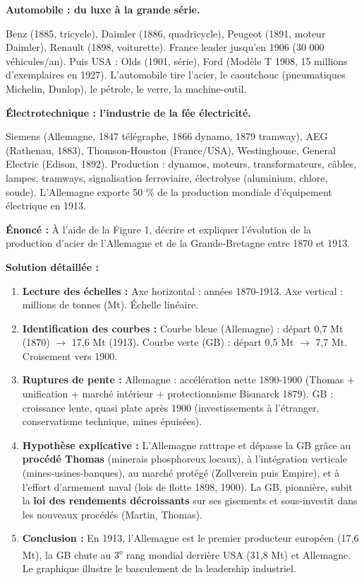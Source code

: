 \documentclass[11pt]{article}
\begin{document}
\textbf{Automobile : du luxe à la grande série.}\par
Benz (1885, tricycle), Daimler (1886, quadricycle), Peugeot (1891, moteur Daimler), Renault (1898, voiturette). France leader jusqu'en 1906 (30 000 véhicules/an). Puis USA : Olds (1901, série), Ford (Modèle T 1908, 15 millions d'exemplaires en 1927). L'automobile tire l'acier, le caoutchouc (pneumatiques Michelin, Dunlop), le pétrole, le verre, la machine-outil.

\textbf{Électrotechnique : l'industrie de la fée électricité.}\par
Siemens (Allemagne, 1847 télégraphe, 1866 dynamo, 1879 tramway), AEG (Rathenau, 1883), Thomson-Houston (France/USA), Westinghouse, General Electric (Edison, 1892). Production : dynamos, moteurs, transformateurs, câbles, lampes, tramways, signalisation ferroviaire, électrolyse (aluminium, chlore, soude). L'Allemagne exporte 50 \% de la production mondiale d'équipement électrique en 1913.

\begin{exoresolu}
\textbf{Énoncé :} À l'aide de la Figure 1, décrire et expliquer l'évolution de la production d'acier de l'Allemagne et de la Grande-Bretagne entre 1870 et 1913.

\textbf{Solution détaillée :}
\begin{enumerate}
    \item \textbf{Lecture des échelles :} Axe horizontal : années 1870-1913. Axe vertical : millions de tonnes (Mt). Échelle linéaire.
    \item \textbf{Identification des courbes :} Courbe bleue (Allemagne) : départ 0,7 Mt (1870) $\to$ 17,6 Mt (1913). Courbe verte (GB) : départ 0,5 Mt $\to$ 7,7 Mt. Croisement vers 1900.
    \item \textbf{Ruptures de pente :} Allemagne : accélération nette 1890-1900 (Thomas + unification + marché intérieur + protectionnisme Bismarck 1879). GB : croissance lente, quasi plate après 1900 (investissements à l'étranger, conservatisme technique, mines épuisées).
    \item \textbf{Hypothèse explicative :} L'Allemagne rattrape et dépasse la GB grâce au \textbf{procédé Thomas} (minerais phosphoreux locaux), à l'intégration verticale (mines-usines-banques), au marché protégé (Zollverein puis Empire), et à l'effort d'armement naval (lois de flotte 1898, 1900). La GB, pionnière, subit la \textbf{loi des rendements décroissants} sur ses gisements et sous-investit dans les nouveaux procédés (Martin, Thomas).
    \item \textbf{Conclusion :} En 1913, l'Allemagne est le premier producteur européen (17,6 Mt), la GB chute au 3\textsuperscript{e} rang mondial derrière USA (31,8 Mt) et Allemagne. Le graphique illustre le basculement de la leadership industriel.
\end{enumerate}
\end{exoresolu}
\end{document}
